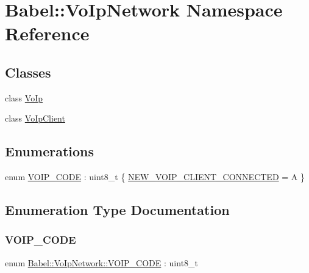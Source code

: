 \hypertarget{namespaceBabel_1_1VoIpNetwork}{}\section{Babel\+:\+:Vo\+Ip\+Network Namespace Reference}
\label{namespaceBabel_1_1VoIpNetwork}
\subsection*{Classes}
\begin{DoxyCompactItemize}
\item 
class \hyperlink{classBabel_1_1VoIpNetwork_1_1VoIp}{Vo\+Ip}
\item 
class \hyperlink{classBabel_1_1VoIpNetwork_1_1VoIpClient}{Vo\+Ip\+Client}
\end{DoxyCompactItemize}
\subsection*{Enumerations}
\begin{DoxyCompactItemize}
\item 
enum \hyperlink{namespaceBabel_1_1VoIpNetwork_ad923848e507b4aaa9a29cefc89b2dd7a}{V\+O\+I\+P\+\_\+\+C\+O\+DE} \+: uint8\+\_\+t \{ \hyperlink{namespaceBabel_1_1VoIpNetwork_ad923848e507b4aaa9a29cefc89b2dd7aa2b0d18e868ec495334e187277b321501}{N\+E\+W\+\_\+\+V\+O\+I\+P\+\_\+\+C\+L\+I\+E\+N\+T\+\_\+\+C\+O\+N\+N\+E\+C\+T\+ED} = \textquotesingle{}A\textquotesingle{}
 \}
\end{DoxyCompactItemize}


\subsection{Enumeration Type Documentation}
\mbox{\label{namespaceBabel_1_1VoIpNetwork_ad923848e507b4aaa9a29cefc89b2dd7a}} 
\subsubsection{\texorpdfstring{V\+O\+I\+P\+\_\+\+C\+O\+DE}{VOIP\_CODE}}
{\footnotesize\ttfamily enum \hyperlink{namespaceBabel_1_1VoIpNetwork_ad923848e507b4aaa9a29cefc89b2dd7a}{Babel\+::\+Vo\+Ip\+Network\+::\+V\+O\+I\+P\+\_\+\+C\+O\+DE} \+: uint8\+\_\+t}

